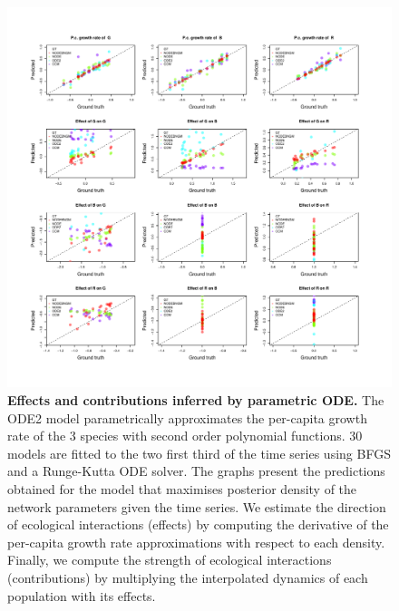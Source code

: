 \documentclass[11pt, oneside]{article}
\begin{document}
\begin{figure}[H]
\includegraphics[width=1\linewidth,page=4]{figures/figures_supplementary.pdf}
\caption{
    \textbf{Effects and contributions inferred by parametric ODE.}
    The ODE2 model parametrically approximates the per-capita growth rate of the 3 species with second order polynomial functions.
    30 models are fitted to the two first third of the time series using BFGS and a Runge-Kutta ODE solver.
    The graphs present the predictions obtained for the model that maximises posterior density of the network parameters given the time series.
    We estimate the direction of ecological interactions (effects) by computing the derivative of the per-capita growth rate approximations with respect to each density.
    Finally, we compute the strength of ecological interactions (contributions) by multiplying the interpolated dynamics of each population with its effects.
}
\end{figure}
\newpage
\end{document}
